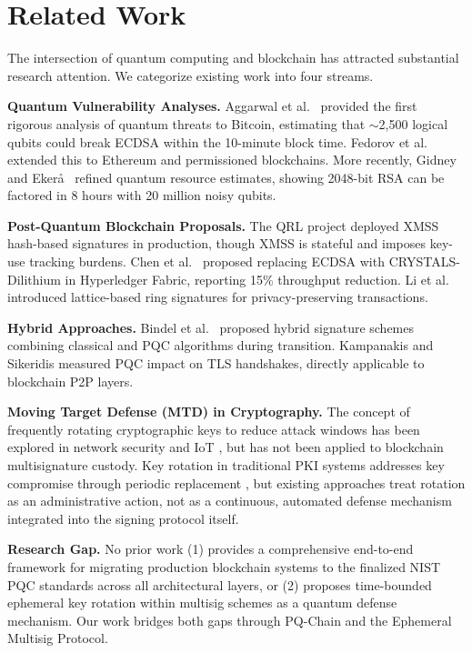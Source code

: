 \documentclass[12pt, a4paper, twocolumn]{article}
\begin{document}
\section{Related Work}
\label{sec:related}

The intersection of quantum computing and blockchain has attracted substantial research attention. We categorize existing work into four streams.

\textbf{Quantum Vulnerability Analyses.}
Aggarwal et al.\ \cite{aggarwal2018quantum} provided the first rigorous analysis of quantum threats to Bitcoin, estimating that $\sim$2,500 logical qubits could break ECDSA within the 10-minute block time. Fedorov et al.\ \cite{fedorov2018quantum} extended this to Ethereum and permissioned blockchains. More recently, Gidney and Eker\aa\ \cite{gidney2021factor} refined quantum resource estimates, showing 2048-bit RSA can be factored in 8 hours with 20 million noisy qubits.

\textbf{Post-Quantum Blockchain Proposals.}
The QRL project \cite{qrl2018} deployed XMSS hash-based signatures in production, though XMSS is stateful and imposes key-use tracking burdens. Chen et al.\ \cite{chen2021postquantum} proposed replacing ECDSA with CRYSTALS-Dilithium in Hyperledger Fabric, reporting 15\% throughput reduction. Li et al.\ \cite{li2021lattice} introduced lattice-based ring signatures for privacy-preserving transactions.

\textbf{Hybrid Approaches.}
Bindel et al.\ \cite{bindel2019hybrid} proposed hybrid signature schemes combining classical and PQC algorithms during transition. Kampanakis and Sikeridis \cite{kampanakis2020pqtls} measured PQC impact on TLS handshakes, directly applicable to blockchain P2P layers.

\textbf{Moving Target Defense (MTD) in Cryptography.}
The concept of frequently rotating cryptographic keys to reduce attack windows has been explored in network security \cite{jajodia2011moving} and IoT \cite{cho2020mtdiot}, but has not been applied to blockchain multisignature custody. Key rotation in traditional PKI systems addresses key compromise through periodic replacement \cite{anderson2020key}, but existing approaches treat rotation as an administrative action, not as a continuous, automated defense mechanism integrated into the signing protocol itself.

\textbf{Research Gap.}
No prior work (1) provides a comprehensive end-to-end framework for migrating production blockchain systems to the finalized NIST PQC standards across all architectural layers, or (2) proposes time-bounded ephemeral key rotation within multisig schemes as a quantum defense mechanism. Our work bridges both gaps through PQ-Chain and the Ephemeral Multisig Protocol.
\end{document}
